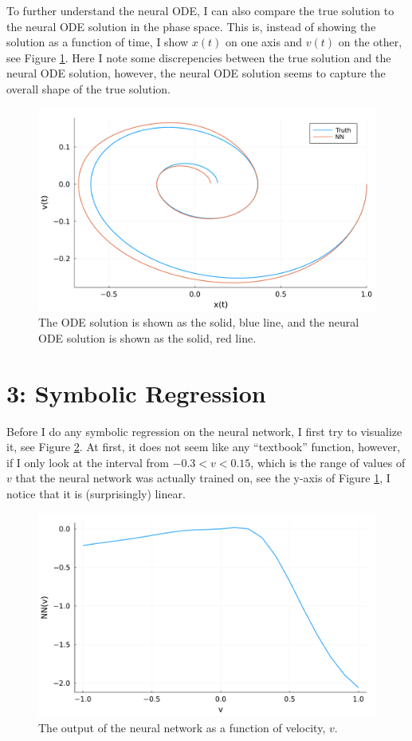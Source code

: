\documentclass[10pt,a4paper]{article}
\begin{document}
To further understand the neural ODE, I can also compare the true solution to the
neural ODE solution in the phase space. This is, instead of showing the solution
as a function of time, I show $x(t)$ on one axis and $v(t)$ on the other,
see Figure \ref{fig:NN_ODE_phase_space}.
Here I note some discrepencies between the true solution and the neural ODE solution,
however, the neural ODE solution seems to capture the overall shape of the true solution.

\begin{figure}[H]
    \includegraphics[width=\linewidth]{phase_space.pdf}
    \caption{The ODE solution is shown as the solid, blue line,
        and the neural ODE solution is shown as the solid, red line.}
    \label{fig:NN_ODE_phase_space}
\end{figure}


\section*{3: Symbolic Regression}

Before I do any symbolic regression on the neural network, I first try to visualize it, see Figure \ref{fig:NN}.
At first, it does not seem like any ``textbook'' function, however, if I only look at the
interval from $-0.3 < v < 0.15$, which is the range of values of $v$ that the neural network was actually trained on,
see the y-axis of Figure \ref{fig:NN_ODE_phase_space}, I notice that it is (surprisingly) linear.

\begin{figure}[H]
    \includegraphics[width=\linewidth]{nn.pdf}
    \caption{The output of the neural network as a function of velocity, $v$.}
    \label{fig:NN}
\end{figure}
\end{document}
